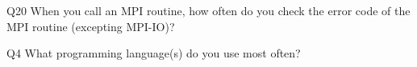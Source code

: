 \begin{description}%
\item{Q20} When you call an MPI routine, how often do you check the error code of the MPI routine  (excepting MPI-IO)?%
\item{Q4} What programming language(s) do you use most often?%
\end{description}%
